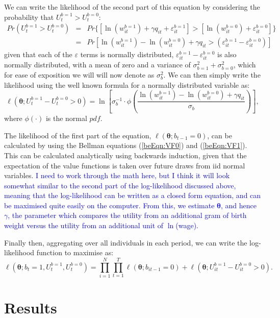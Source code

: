 \documentclass[a4paper, 11 pt]{article}
\theoremstyle{plain}
\begin{document}
\begin{spacing}{1.4}
We can write the likelihood of the second part of this equation by considering
the probability that $U_t^{b=1}>U_t^{b=0}$:
\begin{eqnarray}
\label{bqEqn:LL2}
Pr(U_t^{b=1}>U_t^{b=0})&=&Pr\{[\ln(w_{it}^{b=1}) + \gamma q_{it} + \varepsilon^{b=1}_{it}]
>[\ln(w_{it}^{b=0}) + \varepsilon^{b=0}_{it}]\} \nonumber \\
&=&Pr[\ln(w_{it}^{b=1})-\ln(w_{it}^{b=0})+ \gamma q_{it} > 
(\varepsilon^{b=1}_{it}-\varepsilon^{b=0}_{it})] 
\end{eqnarray}
given that each of the $\varepsilon$ terms is normally distributed, 
$\varepsilon^{b=1}_{it}-\varepsilon^{b=0}_{it}$ is also normally distributed,
with a mean of zero and a variance of $\sigma_{b=1}^2+\sigma_{b=0}^2$, which for
ease of exposition we will will now denote as $\sigma^2_b$.  We can then simply 
write the likelihood using the well known formula for a normally distributed 
variable as:
\begin{equation}
\ell(\bm\theta;U_t^{b=1}-U_t^{b=0}>0) = \ln\left[\sigma_b^{-1}\cdot\phi
\left(\frac{\ln(w_{it}^{b=1})-\ln(w_{it}^{b=0})+ \gamma q_{it}}{\sigma_b}\right)\right],
\end{equation}
where $\phi(\cdot)$ is the normal $pdf$.

The likelihood of the first part of the equation, $\ell(\bm\theta;b_{t-1}=0)$, can 
be calculated by using the Bellman equations (\ref{beEqn:VF0}) and (\ref{beEqn:VF1}).  
This can be calculated analytically using backwards induction, given that the 
expectation of the value functions is taken over future draws from iid normal 
variables.  \textcolor{blue}{I need to work through the math here, but I think it 
will look somewhat similar to the second part of the log-likelihood discussed above, 
meaning that the log-likelihood can be written as a closed form equation, and can be 
maximised quite easily on the computer.  From this, we estimate $\bm{\theta}$, and 
hence $\gamma$, the parameter which compares the utility from an additional gram of 
birth weight versus the utility from an additional unit of $\ln$(wage).}

Finally then, aggregating over all individuals in each period, we can write the
log-likelihood function to maximise as:
\[
\ell(\bm\theta;b_t=1,U_t^{b=1},U_t^{b=0})= \prod_{i=1}^N\prod_{t=1}^T
\ell(\bm\theta;b_{it-1}=0) + \ell(\bm\theta;U_{it}^{b=1}-U_{it}^{b=0}>0).
\]

\section{Results}

\end{spacing}
\end{document}
